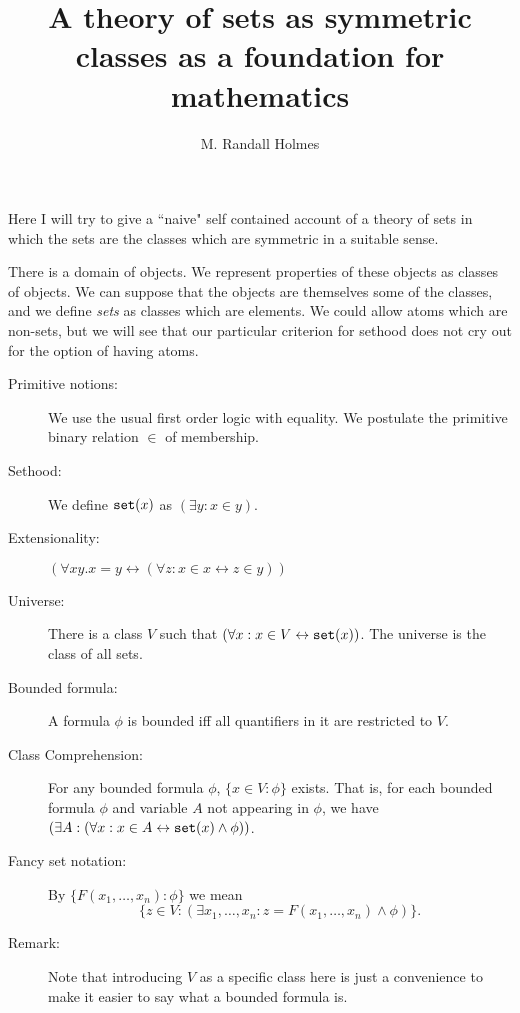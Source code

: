 \documentclass[12pt]{article}
\title{A theory of sets as symmetric classes as a foundation for mathematics}
\author{M. Randall Holmes}
\begin{document}
\maketitle


Here I will try to give a ``naive" self contained account of a theory of sets in which the sets are the classes which are symmetric in a suitable sense.

There is a domain of objects.  We represent properties of these objects as classes of objects.  We can suppose that the objects are themselves some of the classes,
and we define {\em sets\/} as classes which are elements.  We could allow atoms which are non-sets, but we will see that our particular criterion for sethood
does not cry out for the option of having atoms.

\begin{description}

\item[Primitive notions:]  We use the usual first order logic with equality.  We postulate the primitive binary relation $\in$ of membership.

\item[Sethood:]  We define ${\tt set}(x)$ as $(\exists y:x \in y)$.

\item[Extensionality:]  $(\forall xy.x=y \leftrightarrow (\forall z:x \in x \leftrightarrow z \in y))$

\item[Universe:]  There is a class $V$ such that $(\forall x:x \in V \leftrightarrow {\tt set}(x))$.  The universe is the class of all sets.

\item[Bounded formula:]  A formula $\phi$ is bounded iff all quantifiers in it are restricted to $V$.

\item[Class Comprehension:]  For any bounded formula $\phi$, $\{x \in V:\phi\}$ exists.  That is, for each bounded formula $\phi$ and variable $A$ not appearing in $\phi$,
we have $(\exists A:(\forall x:x \in A \leftrightarrow {\tt set}(x) \wedge \phi))$.

\item[Fancy set notation:]  By $\{F(x_1,\ldots,x_n):\phi\}$ we mean $$\{z\in V:(\exists x_1,\ldots,x_n:z=F(x_1,\ldots,x_n) \wedge \phi)\}.$$

\item[Remark:]  Note that introducing $V$ as a specific class here is just a convenience to make it easier to say what a bounded formula is.

\end{description}
\end{document}
